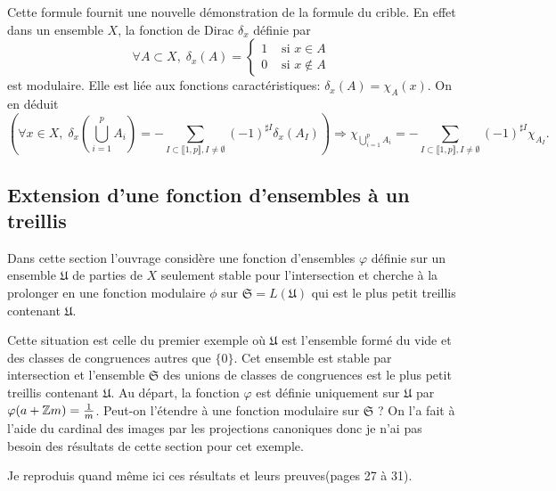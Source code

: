\begin{rem}
  Cette formule fournit une nouvelle démonstration de la formule du crible. En effet dans un ensemble $X$, la fonction de Dirac $\delta_x$ définie par
  \begin{displaymath}
     \forall A \subset X, \;\delta_x(A) =
    \left\lbrace
    \begin{aligned}
      1 &\text{ si } x \in A \\
      0 &\text{ si } x \notin A
    \end{aligned}
    \right.
  \end{displaymath}
  est modulaire. Elle est liée aux fonctions caractéristiques: $\delta_x(A) = \chi_A(x)$. On en déduit
  \begin{displaymath}
    \left( \forall x \in X, \; \delta_x(\bigcup_{i=1}^p A_i) = - \sum_{I \subset \llbracket 1,p \rrbracket, I\neq \emptyset} (-1)^{\sharp I}\delta_x(A_I) \right)
    \Rightarrow  \chi_{\bigcup_{i=1}^p A_i} = - \sum_{I \subset \llbracket 1,p \rrbracket, I\neq \emptyset} (-1)^{\sharp I}\chi_{A_I}.
  \end{displaymath}
\end{rem}


\subsection{Extension d'une fonction d'ensembles à un treillis}
Dans cette section l'ouvrage considère une fonction d'ensembles $\varphi$ définie sur un ensemble $\mathfrak{U}$ de parties de $X$ seulement stable pour l'intersection et cherche à la prolonger en une fonction modulaire $\phi$ sur $\mathfrak{S} = L(\mathfrak{U})$ qui est le plus petit treillis contenant $\mathfrak{U}$.

Cette situation est celle du premier exemple où $\mathfrak{U}$ est l'ensemble formé du vide et des classes de congruences autres que $\{0\}$. Cet ensemble est stable par intersection et l'ensemble $\mathfrak{S}$ des unions de classes de congruences est le plus petit treillis contenant $\mathfrak{U}$.
Au départ, la fonction $\varphi$ est définie uniquement sur $\mathfrak{U}$ par  $\varphi(a + \mathbb{Z} m) = \frac{1}{m}$.
Peut-on l'étendre à une fonction modulaire sur $\mathfrak{S}$ ? On l'a fait à l'aide du cardinal des images par les projections canoniques donc je n'ai pas besoin des résultats de cette section pour cet exemple.

Je reproduis quand même ici ces résultats et leurs preuves(pages 27 à 31).

